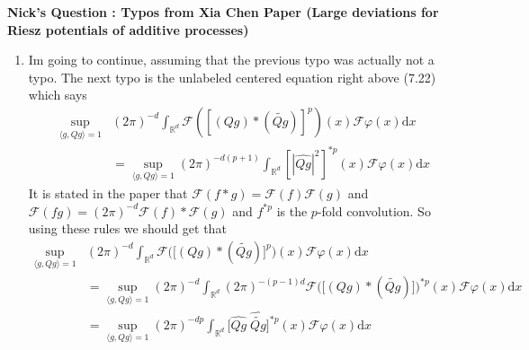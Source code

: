 \documentclass[a4paper,11pt]{article}
\numberwithin{equation}{section}
\theoremstyle{plain}
\theoremstyle{definition}
\newcommand{\ud}{\ensuremath{\mathrm{d} }}
\newcommand{\R}{\mathbb{R}}
\newcounter{NQ}
\newenvironment{NickQuestion}[1][] %
{\refstepcounter{NQ}
	\begin{mdframed}[backgroundcolor=lightgray]\textbf{Nick's Question \theNQ \: #1~~}~~~\noindent}%
	{\end{mdframed}}
\numberwithin{NQ}{section}
\numberwithin{LQ}{section}
\numberwithin{ZQ}{section}
\begin{document}
\begin{NickQuestion}[ : Typos from Xia Chen Paper (Large deviations for Riesz potentials of additive processes) ]
\begin{enumerate}
			\textbf{Nicks Solution:} The centered equation (7.20) in the Xia Chen papers says
			\[
			\int_{\R^d} \left[ \int_{\R^d} (Qg)(s+t)(Qg)(t) \ud t \right]^p \varphi(s) \ud s = \int_{\R^d} \left[ (Qg)*(\widetilde{Qg}) \right]^p(-s) \varphi(s) \ud s
			\]

			and this equality is true, but we can continue is a different way. Using a substitution $u=s+t$ we see that
			\begin{align*}
			\int_{\R^d} \left[ \int_{\R^d} (Qg)(s+t)(Qg)(t) \ud t \right]^p \varphi(s) \ud s &= 	\int_{\R^d} \left[ \int_{\R^d} (Qg)(u)(Qg)(u-s) \ud u \right]^p \varphi(s) \ud s
			\\&= \int_{\R^d} \left[ \int_{\R^d} (Qg)(u)(\widetilde{Qg})(s-u) \ud u \right]^p \varphi(s) \ud s
			\\&= \int_{\R^d} \left[ (Qg)*(\widetilde{Qg}) \right]^p(s) \varphi(s) \ud s
			\end{align*}
			and know we can apply Parsevals to see that
			\begin{align*}
			\int_{\R^d} \left[ (Qg)*(\widetilde{Qg}) \right]^p(s) \varphi(s) \ud s &=  (2\pi)^{-d}\int_{\R^d} \mathcal{F}\left[ (Qg)*(\widetilde{Qg}) \right]^p(x) \mathcal{F}\varphi(x) \ud x
			\end{align*}
			and this gives us equation (7.21). What this actually showed was
			\[
			s \mapsto \int_{\R^d} (Qg)(s+t)(Qg)(t) \ud t
			\]
			is an even function no matter what $(Qg)$ by just applying the substitution $u=s+t$.
			\item Im going to continue, assuming that the previous typo was actually not a typo. The next typo is the unlabeled centered equation right above (7.22) which says
			\begin{align} \label{typo2}
			\sup_{\langle g, Qg \rangle =1}  &	(2 \pi)^{-d}\int_{\R^d} \mathcal{F}( [ (Qg)*(\widetilde{Qg}) ]^p )(x)\mathcal{F}\varphi(x) \ud x \\
			&= \sup_{\langle g, Qg \rangle =1} 	(2\pi)^{-d(p+1)} \int_{\R^d} [ |\widehat{Qg}|^2 ]^{*p}(x) \mathcal{F}\varphi(x) \ud x  \nonumber
			\end{align}
			It is stated in the paper that $\mathcal{F}(f*g) = \mathcal{F}(f)\mathcal{F}(g)$ and $\mathcal{F}(fg) = (2\pi)^{-d}\mathcal{F}(f) * \mathcal{F}(g)$ and $f^{*p}$ is the $p$-fold convolution. So using these rules we should get that
			\begin{align*}
			\sup_{\langle g, Qg \rangle =1} &	(2 \pi)^{-d}\int_{\R^d} \mathcal{F}\bigg( \big[ (Qg)*(\widetilde{Qg}) \big]^p \bigg)(x)\mathcal{F}\varphi(x) \ud x \\
			&= 		\sup_{\langle g, Qg \rangle =1}  (2 \pi)^{-d}\int_{\R^d} (2\pi)^{-(p-1)d} \mathcal{F}\bigg( \big[ (Qg)*(\widetilde{Qg}) \big] \bigg)^{*p}(x)\mathcal{F}\varphi(x) \ud x \\
			&=	\sup_{\langle g, Qg \rangle =1}  (2 \pi)^{-dp}\int_{\R^d}  \bigg[ \widehat{Qg}\;\widehat{\widetilde{Qg}} \bigg] ^{*p}(x)\mathcal{F}\varphi(x) \ud x
			\end{align*}


\end{enumerate}
\end{NickQuestion}
\end{document}
